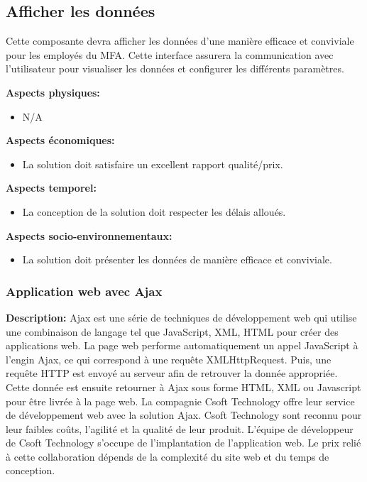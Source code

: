 \subsection{Afficher les données}
Cette composante devra afficher les données d'une manière efficace et conviviale pour les employés du MFA. Cette interface assurera la communication avec l'utilisateur pour visualiser les données et configurer les différents paramètres. \vspace{5mm}

\textbf{Aspects physiques:}
\begin{itemize} [label = {--}]
    \item N/A
\end{itemize}

\textbf{Aspects économiques:}
\begin{itemize} [label = {--}]
    \item La solution doit satisfaire un excellent rapport qualité/prix.
\end{itemize}

\textbf{Aspects temporel:}
\begin{itemize} [label = {--}]
    \item La conception de la solution doit respecter les délais alloués.
\end{itemize}

\textbf{Aspects socio-environnementaux:}
\begin{itemize} [label = {--}]
    \item La solution doit présenter les données de manière efficace et conviviale.
\end{itemize}


\subsubsection{Application web avec Ajax}

\textbf{Description:} Ajax est une série de techniques de développement web qui utilise une combinaison de langage tel que JavaScript, XML, HTML pour créer des applications web. La page web performe automatiquement un appel JavaScript à l'engin Ajax, ce qui correspond à une requête XMLHttpRequest. Puis, une requête HTTP est envoyé au serveur afin de retrouver la donnée appropriée. Cette donnée est ensuite retourner à Ajax sous forme HTML, XML ou Javascript pour être livrée à la page web. La compagnie Csoft Technology offre leur service de développement web avec la solution Ajax. Csoft Technology sont reconnu pour leur faibles coûts, l'agilité et la qualité de leur produit. L'équipe de développeur de Csoft Technology s'occupe de l'implantation de l'application web. Le prix relié à cette collaboration dépends de la complexité du site web et du temps de conception.

